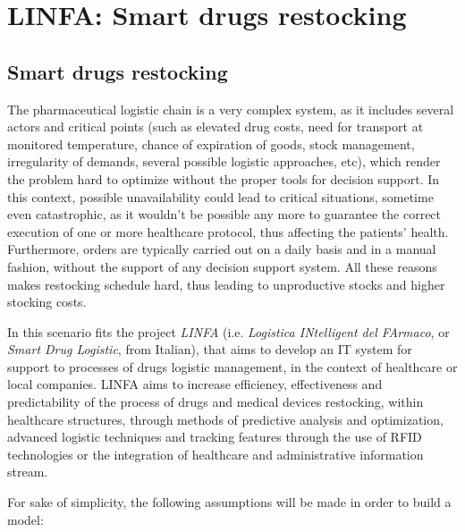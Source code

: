 
\section*{LINFA: Smart drugs restocking}

  \subsection*{Smart drugs restocking}

    The pharmaceutical logistic chain is a very complex system, as it includes several actors and critical points (such as elevated drug costs, need for transport at monitored temperature, chance of expiration of goods, stock management, irregularity of demands, several possible logistic approaches, etc), which render the problem hard to optimize without the proper tools for decision support. In this context, possible unavailability could lead to critical situations, sometime even catastrophic, as it wouldn't be possible any more to guarantee the correct execution of one or more healthcare protocol, thus affecting the patients' health. Furthermore, orders are typically carried out on a daily basis and in a manual fashion, without the support of any decision support system. All these reasons makes restocking schedule hard, thus leading to unproductive stocks and higher stocking costs.
    
    In this scenario fits the project \textit{LINFA} (i.e. \textit{Logistica INtelligent del FArmaco}, or \textit{Smart Drug Logistic}, from Italian), that aims to develop an IT system for support to processes of drugs logistic management, in the context of healthcare or local companies. LINFA aims to increase efficiency, effectiveness and predictability of the process of drugs and medical devices restocking, within healthcare structures, through methods of predictive analysis and optimization, advanced logistic techniques and tracking features through the use of RFID technologies or the integration of healthcare and administrative information stream.
    
    For sake of simplicity, the following assumptions will be made in order to build a model:
    
